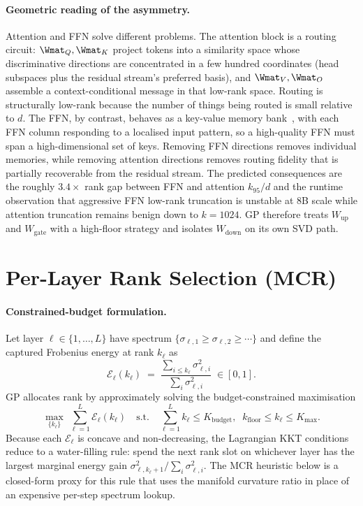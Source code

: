 \documentclass[11pt]{article}
\begin{document}
\paragraph{Geometric reading of the asymmetry.}
Attention and FFN solve different problems. The attention block is a
routing circuit: $\Wmat_Q,\Wmat_K$ project tokens into a similarity
space whose discriminative directions are concentrated in a few hundred
coordinates (head subspaces plus the residual stream's preferred basis),
and $\Wmat_V,\Wmat_O$ assemble a context-conditional message in that
low-rank space. Routing is structurally low-rank because the number of
things being routed is small relative to $d$. The FFN, by contrast,
behaves as a key-value memory bank~\cite{geva2021ffn}, with each FFN
column responding to a localised input pattern, so a high-quality FFN
must span a high-dimensional set of keys. Removing FFN directions removes
individual memories, while removing attention directions removes routing
fidelity that is partially recoverable from the residual stream. The
predicted consequences are the roughly $3.4\times$ rank gap between
FFN and attention $k_{95}/d$ and the runtime observation that aggressive
FFN low-rank truncation is unstable at 8B scale while attention
truncation remains benign down to $k{=}1024$. GP therefore treats
$W_\text{up}$ and $W_\text{gate}$ with a high-floor strategy and isolates
$W_\text{down}$ on its own SVD path.

\section{Per-Layer Rank Selection (MCR)}
\label{sec:mcr}

\paragraph{Constrained-budget formulation.}
Let layer $\ell\in\{1,\dots,L\}$ have spectrum
$\{\sigma_{\ell,1}\geq\sigma_{\ell,2}\geq\cdots\}$ and define the captured
Frobenius energy at rank $k_\ell$ as
\begin{equation}
\mathcal{E}_\ell(k_\ell)\;=\;\frac{\sum_{i\le k_\ell}\sigma_{\ell,i}^2}{\sum_i\sigma_{\ell,i}^2}\;\in[0,1].
\label{eq:Eell}
\end{equation}
GP allocates rank by approximately solving the budget-constrained
maximisation
\begin{equation}
\max_{\{k_\ell\}}\;\sum_{\ell=1}^{L}\mathcal{E}_\ell(k_\ell)
\quad\text{s.t.}\quad
\sum_{\ell=1}^{L}k_\ell\le K_\text{budget},\;\;
k_\text{floor}\le k_\ell\le K_\text{max}.
\label{eq:mcr}
\end{equation}
Because each $\mathcal{E}_\ell$ is concave and non-decreasing, the
Lagrangian KKT conditions reduce to a water-filling rule: spend the next
rank slot on whichever layer has the largest marginal energy gain
$\sigma_{\ell,k_\ell+1}^2 / \sum_i\sigma_{\ell,i}^2$.  The MCR heuristic
below is a closed-form proxy for this rule that uses the manifold
curvature ratio in place of an expensive per-step spectrum lookup.
\end{document}
